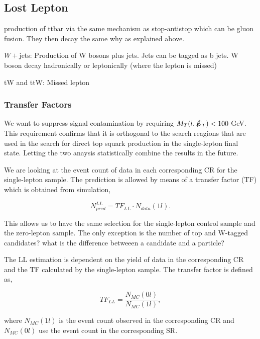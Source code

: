 \subsection{Lost Lepton}
\label{subsec:LL}

\ttbar{} production of ttbar via the same mechanism as stop-antistop which can be gluon fusion. They then decay the same why as explained above.

$W+$jets: Production of W bosons plus jets. Jets can be tagged as b jets. W boson decay hadronically or leptonically (where the lepton is missed)

tW and ttW: Missed lepton

\subsubsection{Transfer Factors}
\label{subsec:TF}

We want to suppress signal contamination by requiring $M_{T}(l, \slashed{E}_{T}) < 100$ GeV. This requirement confirms that it is orthogonal to the search reagions that are used in the search for direct top squark production in the single-lepton final state. Letting the two anaysis statistically combine the results in the future. 

We are looking at the event count of data in each corresponding CR for the single-lepton sample. The prediction is allowed by means of a transfer factor (TF) which is obtained from simulation,

\begin{equation}
\label{eqn:LLTF}
N_{pred}^{LL}=TF_{LL} \cdot N_{data}(1l).
\end{equation}

This allows us to have the same selection for the single-lepton control sample and the zero-lepton sample. The only exception is the number of top and W-tagged candidates? what is the difference betweeen a candidate and a particle?

The LL estimation is dependent on the yield of data in the corresponding CR and the TF calculated by the single-lepton sample. The transfer factor is defined as, 

\begin{equation}
\label{eqn:TF}
TF_{LL}=\frac{N_{MC}(0l)}{N_{MC}(1l)},
\end{equation}

where $N_{MC}(1l)$ is the event count observed in the corresponding CR and $N_{MC}(0l)$ use the event count in the corresponding SR. 

